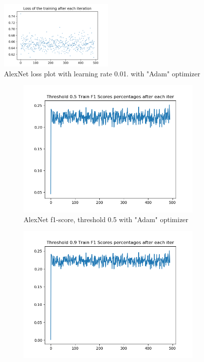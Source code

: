 \documentclass[12pt]{article}
\begin{document}
\begin{figure}[!ht]
\centering
\includegraphics[width=0.5\textwidth]{alexnet-lazy-adam-1_0-train-loss.png}
\caption{\label{alexnet:alexnet-lazy-adam-1_0-train-loss}AlexNet loss plot with learning rate 0.01. with "Adam" optimizer}
\end{figure}

\begin{figure}[!ht]
\centering
\begin{subfigure}{.5\textwidth}
	\centering
	\includegraphics[width=1\linewidth]{alexnet-lazy-adam-1_0-train-scores-f1-5.png}
	\caption{\label{alexnet:alexnet-adam-lazy-1_0-train-scores-f1-5}AlexNet f1-score, threshold 0.5 with "Adam" optimizer}
\end{subfigure}%
\begin{subfigure}{.5\textwidth}
	\centering
	\includegraphics[width=1\linewidth]{alexnet-lazy-adam-1_0-train-scores-f1-9.png}

\end{subfigure}
\end{figure}
\end{document}
